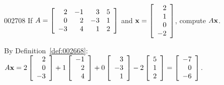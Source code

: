 \begin{example}{}{002708}
If $A = \left[ \begin{array}{rrrr}
2 & -1 & 3 & 5 \\
0 & 2 & -3 & 1 \\
-3 & 4 & 1 & 2 
\end{array} \right]$ and
$\textbf{x} = \left[ \begin{array}{r}
2 \\
1 \\
0 \\
-2
\end{array} \right]$, compute $A\textbf{x}$.


\begin{solution}
  By Definition~\ref{def:002668}: 
  $A\textbf{x} = 2 \left[ \begin{array}{r}
  2 \\
  0 \\
  -3
  \end{array} \right] + 1
  \left[ \begin{array}{r}
  -1 \\
  2 \\
  4
  \end{array} \right] + 0
  \left[ \begin{array}{r}
  3 \\
  -3 \\
  1
  \end{array} \right] - 2
  \left[ \begin{array}{r}
  5 \\
  1 \\
  2
  \end{array} \right] =
  \left[ \begin{array}{r}
  -7 \\
  0 \\
  -6
  \end{array} \right]$.
\end{solution}
\end{example}

